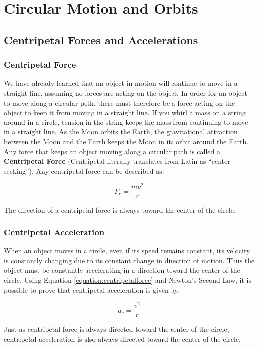 \chapter{Circular Motion and Orbits}
	\section{Centripetal Forces and Accelerations}
	\subsection{Centripetal Force} 
	We have already learned that an object in motion will continue to move in a straight line, assuming no forces are acting on the object.  In order for an object to move along a circular path, there must therefore be a force acting on the object to keep it from moving in a straight line.  If you whirl a mass on a string around in a circle, tension in the string keeps the mass from continuing to move in a straight line.  As the Moon orbits the Earth, the gravitational attraction between the Moon and the Earth keeps the Moon in its orbit around the Earth.  Any force that keeps an object moving along a circular path is called a \textbf{Centripetal Force} (Centripetal literally translates from Latin as ``center seeking'').  Any centripetal force can be described as:
	
	\begin{mdframed}[backgroundcolor=orange!20!white]
	\begin{equation}
	F_c = \frac{mv^2}{r}
	\label{equation:centripetalforce}
	\end{equation}
		
	\end{mdframed}
	

	The direction of a centripetal force is always toward the center of the circle.  

	
	\subsection{Centripetal Acceleration} 
	
	
	
	When an object moves in a circle, even if its speed remains constant, its velocity is constantly changing due to its constant change in direction of motion.  Thus the object must be constantly accelerating in a direction toward the center of the circle.  Using Equation \ref{equation:centripetalforce} and Newton's Second Law, it is possible to prove that centripetal acceleration is given by:			
	\begin{mdframed}[backgroundcolor=orange!20!white]
	\begin{equation}
	a_c = \frac{v^2}{r}
	\end{equation}
	\end{mdframed}
	Just as centripetal force is always directed toward the center of the circle, centripetal acceleration is also always directed toward the center of the circle.  
	
